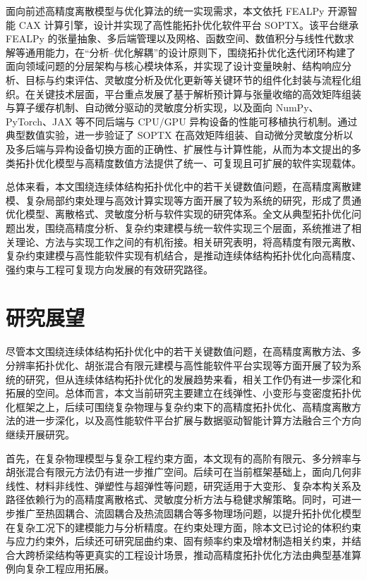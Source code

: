 面向前述高精度离散模型与优化算法的统一实现需求，本文依托 FEALPy 开源智能 CAX 计算引擎，设计并实现了高性能拓扑优化软件平台 SOPTX。该平台继承 FEALPy 的张量抽象、多后端管理以及网格、函数空间、数值积分与线性代数求解等通用能力，在“分析--优化解耦”的设计原则下，围绕拓扑优化迭代闭环构建了面向领域问题的分层架构与核心模块体系，并实现了设计变量映射、结构响应分析、目标与约束评估、灵敏度分析及优化更新等关键环节的组件化封装与流程化组织。在关键技术层面，平台重点发展了基于解析预计算与张量收缩的高效矩阵组装与算子缓存机制、自动微分驱动的灵敏度分析实现，以及面向 NumPy、PyTorch、JAX 等不同后端与 CPU/GPU 异构设备的性能可移植执行机制。通过典型数值实验，进一步验证了 SOPTX 在高效矩阵组装、自动微分灵敏度分析以及多后端与异构设备切换方面的正确性、扩展性与计算性能，从而为本文提出的多类拓扑优化模型与高精度数值方法提供了统一、可复现且可扩展的软件实现载体。

总体来看，本文围绕连续体结构拓扑优化中的若干关键数值问题，在高精度离散建模、复杂局部约束处理与高效计算实现等方面开展了较为系统的研究，形成了贯通优化模型、离散格式、灵敏度分析与软件实现的研究体系。全文从典型拓扑优化问题出发，围绕高精度分析、复杂约束建模与统一软件实现三个层面，系统推进了相关理论、方法与实现工作之间的有机衔接。相关研究表明，将高精度有限元离散、复杂约束建模与高性能软件实现有机结合，是推动连续体结构拓扑优化向高精度、强约束与工程可复现方向发展的有效研究路径。


\section{研究展望}
\label{sec:research_outlook}

尽管本文围绕连续体结构拓扑优化中的若干关键数值问题，在高精度离散方法、多分辨率拓扑优化、胡张混合有限元建模与高性能软件平台实现等方面开展了较为系统的研究，但从连续体结构拓扑优化的发展趋势来看，相关工作仍有进一步深化和拓展的空间。总体而言，本文当前研究主要建立在线弹性、小变形与变密度拓扑优化框架之上，后续可围绕复杂物理与复杂约束下的高精度拓扑优化、高精度离散方法的进一步深化，以及高性能软件平台扩展与数据驱动智能计算方法融合三个方向继续开展研究。

首先，在复杂物理模型与复杂工程约束方面，本文现有的高阶有限元、多分辨率与胡张混合有限元方法仍有进一步推广空间。后续可在当前框架基础上，面向几何非线性、材料非线性、弹塑性与超弹性等问题，研究适用于大变形、复杂本构关系及路径依赖行为的高精度离散格式、灵敏度分析方法与稳健求解策略。同时，可进一步推广至热固耦合、流固耦合及热流固耦合等多物理场问题，以提升拓扑优化模型在复杂工况下的建模能力与分析精度。在约束处理方面，除本文已讨论的体积约束与应力约束外，后续还可研究屈曲约束、固有频率约束及增材制造相关约束，并结合大跨桥梁结构等更真实的工程设计场景，推动高精度拓扑优化方法由典型基准算例向复杂工程应用拓展。

